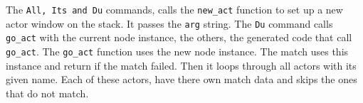The \texttt{All,\ Its\ and\ Du} commands, calls the \texttt{new\_act}
function to set up a new actor window on the stack. It passes the
\texttt{arg} string. The \texttt{Du} command calls \texttt{go\_act} with
the current node instance, the others, the generated code that call
\texttt{go\_act}. The \texttt{go\_act} function uses the new node
instance. The match uses this instance and return if the match failed.
Then it loops through all actors with its given name. Each of these
actors, have there own match data and skips the ones that do not match.
